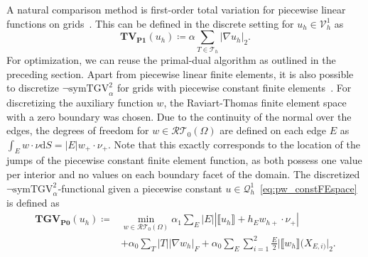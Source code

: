 \documentclass{article}
\newcommand{\dx}{\mathrm{d}}
\newcommand{\NSymTGV}{\neg \mathrm{symTGV}}
\begin{document}
	A natural comparison method is first-order total variation for piecewise linear functions on grids~\cite{Ba14}.
	This can be defined in the discrete setting for $u_h \in \mathcal{V}_h^1$ as
	\begin{equation*}
		\mathbf{TV_{P1}}(u_h) \coloneqq \alpha \sum_{T\in\mathcal{T}_h} \vert\nabla u_h\vert_2.
	\end{equation*}
	For optimization, we can reuse the primal-dual algorithm as outlined in the preceding section.
	Apart from piecewise linear finite elements, it is also possible to discretize $\NSymTGV_\alpha^2$ for grids with piecewise constant finite elements~\cite{Ba23}.
	For discretizing the auxiliary function $w$, the Raviart-Thomas finite element space with a zero boundary was chosen.
	Due to the continuity of the normal over the edges, the degrees of freedom for $w \in \mathcal{RT}_0(\Omega)$ are defined on each edge $E$ as $\int_E w\cdot\nu \dx S = \vert E\vert w_+\cdot\nu_+$.
	Note that this exactly corresponds to the location of the jumps of the piecewise constant finite element function, as both possess one value per interior and no values on each boundary facet of the domain.
	The discretized $\NSymTGV_\alpha^2$-functional given a piecewise constant $u \in \mathcal{Q}_h^1$~\eqref{eq:pw_constFEspace} is defined as
	\begin{align*}
		\mathbf{TGV_{P0}}(u_h) \coloneqq&\min_{w\in \mathcal{RT}_0(\Omega)} \alpha_1 \sum_E \vert E \vert \left\vert \llbracket u_h \rrbracket + h_E w_{h+}\cdot \nu_+\right\vert \\&+ \alpha_0 \sum_T \vert T\vert\vert\nabla w_h\vert_F + \alpha_0 \sum_E \sum_{i=1}^2 \frac{E}{2} \vert \llbracket w_h\rrbracket (X_{E,i)}\vert_2 .
	\end{align*}
	
\end{document}
